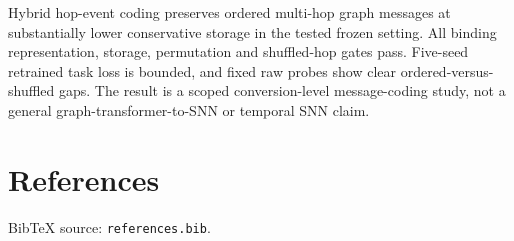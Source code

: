 \documentclass{article}
\begin{document}
\label{sec:conclusion}

Hybrid hop-event coding preserves ordered multi-hop graph messages at substantially lower conservative storage in the tested frozen setting. All binding representation, storage, permutation and shuffled-hop gates pass. Five-seed retrained task loss is bounded, and fixed raw probes show clear ordered-versus-shuffled gaps. The result is a scoped conversion-level message-coding study, not a general graph-transformer-to-SNN or temporal SNN claim.

\section{References}

\label{sec:references}

BibTeX source: \texttt{references.bib}.



\end{document}
